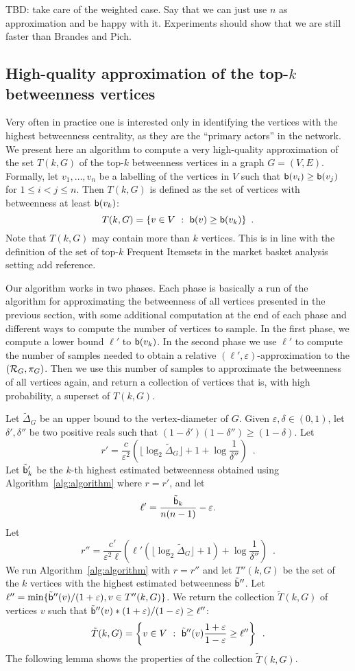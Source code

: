 \XXX TBD: take care of the weighted case. Say that we can just use $n$ as
approximation and be happy with it. Experiments should show that we are still
faster than Brandes and Pich.

\subsection{High-quality approximation of the top-$k$ betweenness
vertices}\label{sec:topk}
Very often in practice one is interested only in identifying the vertices with
the highest betweenness centrality, as they are the ``primary actors'' in the
network. We present here an algorithm to compute a very high-quality
approximation of the set $T(k,G)$ of the top-$k$ betweenness vertices in a graph
$G=(V,E)$. Formally, let $v_1,\dotsc,v_n$ be a labelling of the vertices in $V$
such that $\mathsf{b}(v_i)\ge\mathsf{b}(v_j)$ for $1\le i<j\le n$. Then $T(k,G)$ is
defined as the set of vertices with betweenness at least $\mathsf{b}(v_k)$:
\[
T(k,G)=\{v\in V ~:~ \mathsf{b}(v)\ge\mathsf{b}(v_k)\}\enspace.
\]
Note that $T(k,G)$ may contain more than $k$ vertices. This is in line with the
definition of the set of top-$k$ Frequent Itemsets in the market basket analysis
setting \XXX add reference.

Our algorithm works in two phases. Each phase is basically a run of the
algorithm for approximating the betweenness of all vertices presented in the
previous section, with some additional computation at the end of each phase and
different ways to compute the number of vertices to sample. In the first phase,
we compute a lower bound $\ell'$ to $\mathsf{b}(v_k)$. In the second phase we use
$\ell'$ to compute the number of samples needed to obtain a relative
$(\ell',\varepsilon)$-approximation to the $(\mathcal{R}_G,\pi_G)$. Then we use this
number of samples to approximate the betweenness of all vertices again, and
return a collection of vertices that is, with high probability, a superset of
$T(k,G)$.

Let $\tilde\Delta_G$ be an upper bound to the vertex-diameter of $G$. Given
$\varepsilon,\delta\in(0,1)$, let $\delta',\delta''$ be two positive reals such
that $(1-\delta')(1-\delta'')\ge(1-\delta)$. Let
\[
  r'=\frac{c}{\varepsilon^2}\left(\lfloor\log_2\tilde\Delta_G\rfloor+1+\log\frac{1}{\delta''}\right)\enspace.
\]
Let $\tilde{\mathsf{b}}'_k$ be the $k$-th highest estimated betweenness obtained using
Algorithm~\ref{alg:algorithm} where $r=r'$, and let
\[
  \ell'=\frac{\tilde{\mathsf{b}}_k}{n(n-1)}-\varepsilon.
\]
Let
\[
  r''=\frac{c'}{\varepsilon^2\ell}\left(\ell'(\lfloor\log_2\tilde\Delta_G\rfloor+1)+\log\frac{1}{\delta''}\right)\enspace.
\]
We run Algorithm~\ref{alg:algorithm} with $r=r''$ and let $T''(k,G)$ be the set
of the $k$ vertices with the highest estimated betweenness $\tilde{\mathsf{b}}''$. Let
$\ell''=\min\{\tilde{\mathsf{b}}''(v) / (1+\varepsilon), v\in T''(k,G)\}$. We
return the collection $\tilde T(k,G)$ of vertices $v$ such that
$\tilde{\mathsf{b}}''(v)*(1+\varepsilon)/(1-\varepsilon)\ge\ell''$:
\[
\tilde T(k,G)= \left\{v\in V ~:~
\tilde{\mathsf{b}}''(v)\frac{1+\varepsilon}{1-\varepsilon}\ge\ell''\right\}\enspace.
\]
The following lemma shows the properties of the collection $\tilde T(k,G)$.

